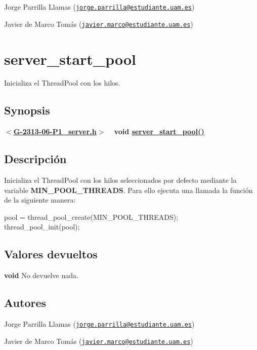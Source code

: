 \begin{DoxyItemize}
\item Jorge Parrilla Llamas (\href{mailto:jorge.parrilla@estudiante.uam.es}{\tt jorge.\+parrilla@estudiante.\+uam.\+es}) 
\item Javier de Marco Tomás (\href{mailto:javier.marco@estudiante.uam.es}{\tt javier.\+marco@estudiante.\+uam.\+es}) 
\end{DoxyItemize}\hypertarget{server_start_pool}{}\section{server\+\_\+start\+\_\+pool}\label{server_start_pool}
Inicializa el Thread\+Pool con los hilos.\hypertarget{server_start_pool_synopsis8}{}\subsection{Synopsis}\label{server_start_pool_synopsis8}
{ {\bfseries $<$\hyperlink{G-2313-06-P1__server_8h}{G-\/2313-\/06-\/\+P1\+\_\+server.\+h}$>$} ~\newline
 {\bfseries void \hyperlink{G-2313-06-P1__server_8c_a48d522cd984dc64ecd084f05416b1a94}{server\+\_\+start\+\_\+pool()}} } \hypertarget{server_start_pool_descripcion8}{}\subsection{Descripción}\label{server_start_pool_descripcion8}
Inicializa el Thread\+Pool con los hilos seleccionados por defecto mediante la variable {\bfseries M\+I\+N\+\_\+\+P\+O\+O\+L\+\_\+\+T\+H\+R\+E\+A\+DS}. Para ello ejecuta una llamada la función de la siguiente manera\+:

{\ttfamily  pool = thread\+\_\+pool\+\_\+create(\+M\+I\+N\+\_\+\+P\+O\+O\+L\+\_\+\+T\+H\+R\+E\+A\+D\+S); ~\newline
thread\+\_\+pool\+\_\+init(pool); } \hypertarget{server_start_pool_return8}{}\subsection{Valores devueltos}\label{server_start_pool_return8}

\begin{DoxyItemize}
\item {\bfseries void} No devuelve nada. 
\end{DoxyItemize}\hypertarget{server_start_pool_authors8}{}\subsection{Autores}\label{server_start_pool_authors8}

\begin{DoxyItemize}
\item Jorge Parrilla Llamas (\href{mailto:jorge.parrilla@estudiante.uam.es}{\tt jorge.\+parrilla@estudiante.\+uam.\+es}) 
\item Javier de Marco Tomás (\href{mailto:javier.marco@estudiante.uam.es}{\tt javier.\+marco@estudiante.\+uam.\+es}) 
\end{DoxyItemize}